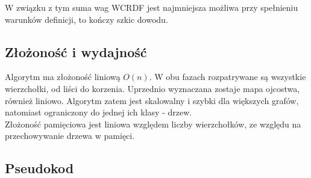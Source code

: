 W związku z tym suma wag WCRDF jest najmniejsza możliwa przy spełnieniu warunków definicji, to kończy szkic dowodu.

\subsection{Złożoność i wydajność}
Algorytm ma złożoność liniową $O(n)$. W obu fazach rozpatrywane są wszystkie wierzchołki, od liści do korzenia. Uprzednio wyznaczana zostaje mapa ojcostwa, również liniowo. Algorytm zatem jest skalowalny i szybki dla większych grafów, natomiast ograniczony do jednej ich klasy - drzew.\\ Złożoność pamięciowa jest liniowa względem liczby wierzchołków, ze względu na przechowywanie drzewa w pamięci.

\subsection{Pseudokod}
